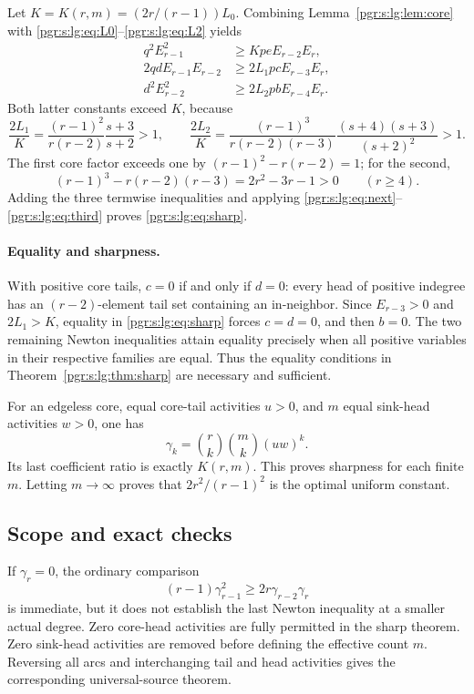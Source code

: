 \documentclass[11pt]{article}
\numberwithin{equation}{section}
\theoremstyle{definition}\newtheorem{definition}[theorem]{Definition}\newtheorem{remark}[theorem]{Remark}
\begin{document}
Let $K=K(r,m)=(2r/(r-1))L_0$. Combining Lemma~\ref{pgr:s:lg:lem:core} with \eqref{pgr:s:lg:eq:L0}--\eqref{pgr:s:lg:eq:L2} yields
\begin{align*}
 q^2E_{r-1}^2&\ge KpeE_{r-2}E_r,\\
 2qdE_{r-1}E_{r-2}&\ge 2L_1pcE_{r-3}E_r,\\
 d^2E_{r-2}^2&\ge 2L_2pbE_{r-4}E_r.
\end{align*}
Both latter constants exceed $K$, because
\[
 \frac{2L_1}{K}=\frac{(r-1)^2}{r(r-2)}\frac{s+3}{s+2}>1,
 \qquad
 \frac{2L_2}{K}=\frac{(r-1)^3}{r(r-2)(r-3)}
                     \frac{(s+4)(s+3)}{(s+2)^2}>1.
\]
The first core factor exceeds one by $(r-1)^2-r(r-2)=1$; for the second,
\[
 (r-1)^3-r(r-2)(r-3)=2r^2-3r-1>0\qquad(r\ge4).
\]
Adding the three termwise inequalities and applying \eqref{pgr:s:lg:eq:next}--\eqref{pgr:s:lg:eq:third} proves \eqref{pgr:s:lg:eq:sharp}.

\paragraph{Equality and sharpness.}
With positive core tails, $c=0$ if and only if $d=0$: every head of positive indegree has an $(r-2)$-element tail set containing an in-neighbor. Since $E_{r-3}>0$ and $2L_1>K$, equality in \eqref{pgr:s:lg:eq:sharp} forces $c=d=0$, and then $b=0$. The two remaining Newton inequalities attain equality precisely when all positive variables in their respective families are equal. Thus the equality conditions in Theorem~\ref{pgr:s:lg:thm:sharp} are necessary and sufficient.

For an edgeless core, equal core-tail activities $u>0$, and $m$ equal sink-head activities $w>0$, one has
\[
 \gamma_k=\binom rk\binom mk(uw)^k.
\]
Its last coefficient ratio is exactly $K(r,m)$. This proves sharpness for each finite $m$. Letting $m\to\infty$ proves that $2r^2/(r-1)^2$ is the optimal uniform constant.

\subsection{Scope and exact checks}
If $\gamma_r=0$, the ordinary comparison
\[
 (r-1)\gamma_{r-1}^2\ge2r\gamma_{r-2}\gamma_r
\]
is immediate, but it does not establish the last Newton inequality at a smaller actual degree. Zero core-head activities are fully permitted in the sharp theorem. Zero sink-head activities are removed before defining the effective count $m$. Reversing all arcs and interchanging tail and head activities gives the corresponding universal-source theorem.
\end{document}
